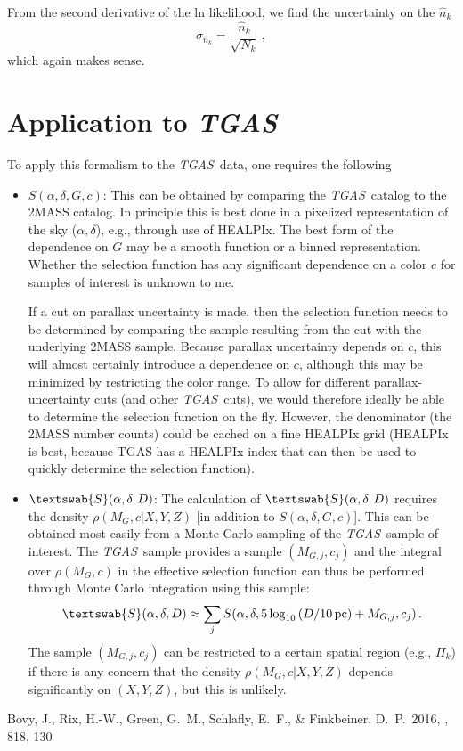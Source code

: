 \documentclass[12pt,preprint]{aastex}
\newcommand{\etal}{et al.}
\newcommand{\eg}{e.g.}
\newcommand{\tgas}{\emph{TGAS}}
\newcommand{\ra}{\ensuremath{\alpha}}
\newcommand{\dec}{\ensuremath{\delta}}
\newcommand{\essf}{\ensuremath{\textswab{S}}}
\newcommand{\pc}{\ensuremath{\,\mathrm{pc}}}
\begin{document}
From the second derivative of the ln likelihood, we find the
uncertainty on the $\hat{n}_k$
\begin{equation}
  \sigma_{\hat{n}_k} = \frac{\hat{n}_k}{\sqrt{N_k}}\,,
\end{equation}
which again makes sense.

\section{Application to \tgas}

To apply this formalism to the \tgas\ data, one requires the following
\begin{itemize}
  \item $S(\ra,\dec,G,c)$: This can be obtained by comparing the
    \tgas\ catalog to the 2MASS catalog. In principle this is best
    done in a pixelized representation of the sky ($\ra,\dec$), \eg,
    through use of HEALPIx. The best form of the dependence on $G$ may
    be a smooth function or a binned representation. Whether the
    selection function has any significant dependence on a color $c$
    for samples of interest is unknown to me.

    If a cut on parallax uncertainty is made, then the selection
    function needs to be determined by comparing the sample resulting
    from the cut with the underlying 2MASS sample. Because parallax
    uncertainty depends on $c$, this will almost certainly introduce a
    dependence on $c$, although this may be minimized by restricting
    the color range. To allow for different parallax-uncertainty cuts
    (and other \tgas\ cuts), we would therefore ideally be able to
    determine the selection function on the fly. However, the
    denominator (the 2MASS number counts) could be cached on a fine
    HEALPIx grid (HEALPIx is best, because TGAS has a HEALPIx index
    that can then be used to quickly determine the selection
    function).
  \item $\essf(\ra,\dec,D)$: The calculation of $\essf(\ra,\dec,D)$
    requires the density $\rho(M_G,c|X,Y,Z)$ [in addition to
      $S(\ra,\dec,G,c)$]. This can be obtained most easily from a
    Monte Carlo sampling of the \tgas\ sample of interest. The
    \tgas\ sample provides a sample $(M_{G,j},c_j)$ and the integral
    over $\rho(M_G,c)$ in the effective selection function can thus be
    performed through Monte Carlo integration using this sample:
    \begin{equation}
      \essf(\ra,\dec,D) \approx \sum_j S(\ra,\dec,5\log_{10}\left(D/10\pc\right)+M_{G,j},c_j)\,.
    \end{equation}
    The sample $(M_{G,j},c_j)$ can be restricted to a certain spatial
    region (\eg, $\Pi_k$) if there is any concern that the density
    $\rho(M_G,c|X,Y,Z)$ depends significantly on $(X,Y,Z)$, but this
    is unlikely.
\end{itemize}

\begin{thebibliography}{}
\bibitem[Bovy \etal(2016)]{Bovy16a} Bovy, J., Rix, H.-W., Green,
  G.~M., Schlafly, E.~F., \& Finkbeiner, D.~P.\ 2016, \apj, 818, 130
\end{thebibliography}
\end{document}
